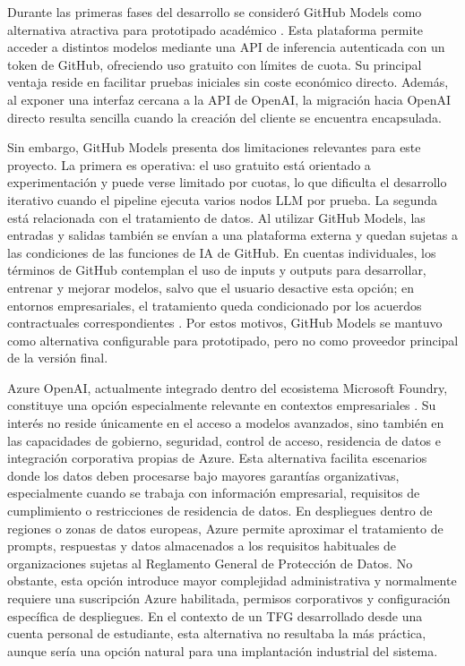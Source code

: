 \documentclass[12pt,a4paper]{article}
\theoremstyle{plain}
\begin{document}
Durante las primeras fases del desarrollo se consideró GitHub Models como alternativa atractiva para prototipado académico \cite{github_models_docs}. Esta plataforma permite acceder a distintos modelos mediante una API de inferencia autenticada con un token de GitHub, ofreciendo uso gratuito con límites de cuota. Su principal ventaja reside en facilitar pruebas iniciales sin coste económico directo. Además, al exponer una interfaz cercana a la API de OpenAI, la migración hacia OpenAI directo resulta sencilla cuando la creación del cliente se encuentra encapsulada.

Sin embargo, GitHub Models presenta dos limitaciones relevantes para este proyecto. La primera es operativa: el uso gratuito está orientado a experimentación y puede verse limitado por cuotas, lo que dificulta el desarrollo iterativo cuando el pipeline ejecuta varios nodos LLM por prueba. La segunda está relacionada con el tratamiento de datos. Al utilizar GitHub Models, las entradas y salidas también se envían a una plataforma externa y quedan sujetas a las condiciones de las funciones de IA de GitHub. En cuentas individuales, los términos de GitHub contemplan el uso de inputs y outputs para desarrollar, entrenar y mejorar modelos, salvo que el usuario desactive esta opción; en entornos empresariales, el tratamiento queda condicionado por los acuerdos contractuales correspondientes \cite{github_ai_terms, github_ai_data_update}. Por estos motivos, GitHub Models se mantuvo como alternativa configurable para prototipado, pero no como proveedor principal de la versión final.

Azure OpenAI, actualmente integrado dentro del ecosistema Microsoft Foundry, constituye una opción especialmente relevante en contextos empresariales \cite{azure_openai_data_privacy}. Su interés no reside únicamente en el acceso a modelos avanzados, sino también en las capacidades de gobierno, seguridad, control de acceso, residencia de datos e integración corporativa propias de Azure. Esta alternativa facilita escenarios donde los datos deben procesarse bajo mayores garantías organizativas, especialmente cuando se trabaja con información empresarial, requisitos de cumplimiento o restricciones de residencia de datos. En despliegues dentro de regiones o zonas de datos europeas, Azure permite aproximar el tratamiento de prompts, respuestas y datos almacenados a los requisitos habituales de organizaciones sujetas al Reglamento General de Protección de Datos. No obstante, esta opción introduce mayor complejidad administrativa y normalmente requiere una suscripción Azure habilitada, permisos corporativos y configuración específica de despliegues. En el contexto de un TFG desarrollado desde una cuenta personal de estudiante, esta alternativa no resultaba la más práctica, aunque sería una opción natural para una implantación industrial del sistema.
\end{document}

